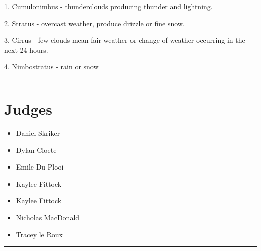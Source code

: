 \documentclass[10pt]{article}
\begin{document}
1. Cumulonimbus - thunderclouds producing thunder and lightning. 

2. Stratus - overcast weather, produce drizzle or fine snow.

3. Cirrus - few clouds mean fair weather or change of weather occurring in the next 24 hours.

4. Nimbostratus - rain or snow
\vspace{0.5cm}
	\hrule
	\vspace{0.5cm}
		\section*{\faUsers \: Judges}

		

	\begin{multicols}{2}

		\begin{itemize}
									\item Daniel Skriker
									\item Dylan Cloete
									\item Emile Du Plooi
									\item Kaylee Fittock
						\end{itemize}

		\vfill\null
		\columnbreak

		\begin{itemize}
									\item Kaylee Fittock
									\item Nicholas MacDonald
									\item Tracey le Roux
						\end{itemize}

		\vfill\null

		\end{multicols}



			\vspace{0.5cm}
	\hrule
	\vspace{0.5cm}
\end{document}
